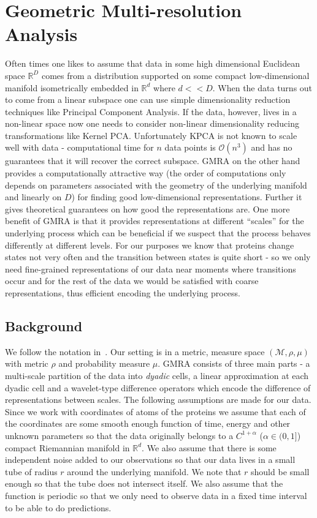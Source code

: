 \documentclass{article}
\begin{document}
	
	
	\section{Geometric Multi-resolution Analysis}
	Often times one likes to assume that data in some high dimensional Euclidean space $\mathbb{R}^D$ comes from a distribution supported on some compact low-dimensional manifold isometrically embedded in $\mathbb{R}^d$ where $d << D$. When the data turns out to come from a linear subspace one can use simple dimensionality reduction techniques like Principal Component Analysis. If the data, however, lives in a non-linear space now one needs to consider non-linear dimensionality reducing transformations like Kernel PCA. Unfortunately KPCA is not known to scale well with data - computational time for $n$ data points is $\mathcal{O}(n^3)$ and has no guarantees that it will recover the correct subspace. GMRA on the other hand provides a computationally attractive way (the order of computations only depends on parameters associated with the geometry of the underlying manifold and linearly on $D$) for finding good low-dimensional representations. Further it gives theoretical guarantees on how good the representations are. One more benefit of GMRA is that it provides representations at different ``scales'' for the underlying process which can be beneficial if we suspect that the process behaves differently at different levels. For our purposes we know that proteins change states not very often and the transition between states is quite short - so we only need fine-grained representations of our data near moments where transitions occur and for the rest of the data we would be satisfied with coarse representations, thus efficient encoding the underlying process.
	\subsection{Background}
	We follow the notation in~\cite{allard2012multi}. Our setting is in a metric, measure space $\left(\mathcal{M},\rho, \mu\right)$ with metric $\rho$ and probability measure $\mu$. GMRA consists of three main parts - a multi-scale partition of the data into \textit{dyadic} cells, a linear approximation at each dyadic cell and a wavelet-type difference operators which encode the difference of representations between scales. The following assumptions are made for our data. Since we work with coordinates of atoms of the proteins we assume that each of the coordinates are some smooth enough function of time, energy and other unknown parameters so that the data originally belongs to a $C^{1+\alpha}$ ($\alpha \in (0,1]$) compact Riemannian manifold in $\mathbb{R}^d$. We also assume that there is some independent noise added to our observations so that our data lives in a small tube of radius $r$ around the underlying manifold. We note that $r$ should be small enough so that the tube does not intersect itself. We also assume that the function is periodic so that we only need to observe data in a fixed time interval to be able to do predictions.
\end{document}
